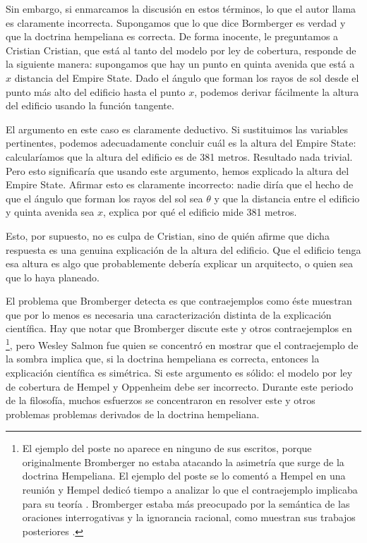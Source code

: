 Sin embargo, si enmarcamos la discusión en estos términos, lo que el
autor llama  es claramente incorrecta.
Supongamos que lo que dice Bormberger es verdad y que la doctrina
hempeliana es correcta. De forma inocente, le preguntamos a Cristian
Cristian, que está al tanto del modelo por ley de cobertura, responde
de la siguiente manera: supongamos que hay un punto en quinta avenida
que está a $x$ distancia del Empire State. Dado el ángulo que forman
los rayos de sol desde el punto más alto del edificio hasta el punto
$x$, podemos derivar fácilmente la altura del edificio usando la
función tangente.

El argumento en este caso es claramente deductivo. Si sustituimos las
variables pertinentes, podemos adecuadamente concluir cuál es la
altura del Empire State: calcularíamos que la altura del edificio es
de 381 metros. Resultado nada trivial. Pero esto significaría que
usando este argumento, hemos explicado la altura del Empire State.
Afirmar esto es claramente incorrecto: nadie diría que el hecho de
que el ángulo que forman los rayos del sol sea $\theta$ y que la
distancia entre el edificio y quinta avenida sea $x$, explica por qué
el edificio mide 381 metros.

Esto, por supuesto, no es culpa de Cristian, sino de quién afirme que
dicha respuesta es una genuina explicación de la altura del edificio.
Que el edificio tenga esa altura es algo que probablemente debería
explicar un arquitecto, o quien sea que lo haya planeado.

El problema que Bromberger detecta es que contraejemplos como éste
muestran que por lo menos es necesaria una caracterización distinta
de la explicación científica. Hay que notar que Bromberger discute
este y otros contraejemplos en \parencite{Bromberger1966}\footnote{
 El ejemplo del poste no aparece en ninguno de sus escritos, porque
 originalmente Bromberger no estaba atacando la asimetría que surge de
 la doctrina Hempeliana. El ejemplo del poste se lo comentó a Hempel
 en una reunión y Hempel dedicó tiempo a analizar lo que el
 contraejemplo implicaba para su teoría \parencite{mitBromberger}.
 Bromberger estaba más preocupado por la semántica de las oraciones
 interrogativas y la ignorancia racional, como muestran sus trabajos
 posteriores \parencite {Bromberger1992}. }, pero Wesley Salmon fue
quien se concentró en mostrar que el contraejemplo de la sombra
implica que, si la doctrina hempeliana es correcta, entonces la
explicación científica es simétrica. Si este argumento es sólido: el
modelo por ley de cobertura de Hempel y Oppenheim debe ser
incorrecto. Durante este periodo de la filosofía, muchos esfuerzos se
concentraron en resolver este y otros problemas problemas derivados
de la doctrina hempeliana.

